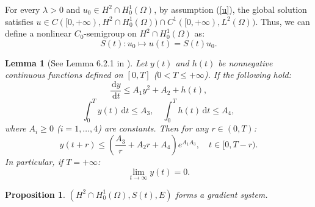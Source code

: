 \documentclass{article}
\numberwithin{equation}{section}
\newtheorem{lemma}{Lemma}[section]
\newtheorem{proposition}[theorem]{Proposition}
\begin{document}
For every $\lambda>0$ and $u_0\in H^2\cap H_0^1(\Omega)$, by assumption (\ref{u}), the global solution satisfies $u\in C([0,+\infty),H^2\cap H_0^1(\Omega))\cap C^1([0,+\infty),L^2(\Omega))$. Thus, we can define a nonlinear $C_0$-semigroup on $H^2\cap H_0^1(\Omega)$ as:
$$S(t):u_0\mapsto u(t)=S(t)u_0.$$

\begin{lemma}[See Lemma 6.2.1 in \cite{ref8}]\label{lemma2.1}
    Let $y(t)$ and $h(t)$ be nonnegative continuous functions defined on $[0,T]$ ($0<T\le +\infty$). If the following hold:
    $$\frac{\,\mathrm{d} y}{\,\mathrm{d} t}\le A_1y^2+A_2+h(t),$$
    $$\int_{0}^{T}y(t)\,\mathrm{d}t\le A_3,\quad \int_{0}^{T}h(t)\,\mathrm{d}t\le A_4,$$
    where $A_i\ge 0$ ($i=1,\dots,4$) are constants. Then for any $r\in(0,T)$:
    $$y(t+r)\le \left(\frac{A_3}{r}+A_2r+A_4\right)e^{A_1A_3},\quad t\in [0,T-r).$$
    In particular, if $T=+\infty$:
    $$\lim_{t \to \infty}y(t)=0.$$
\end{lemma}

\begin{proposition}
  $(H^2\cap H_0^1(\Omega),S(t),E)$ forms a gradient system.
\end{proposition}
\end{document}
